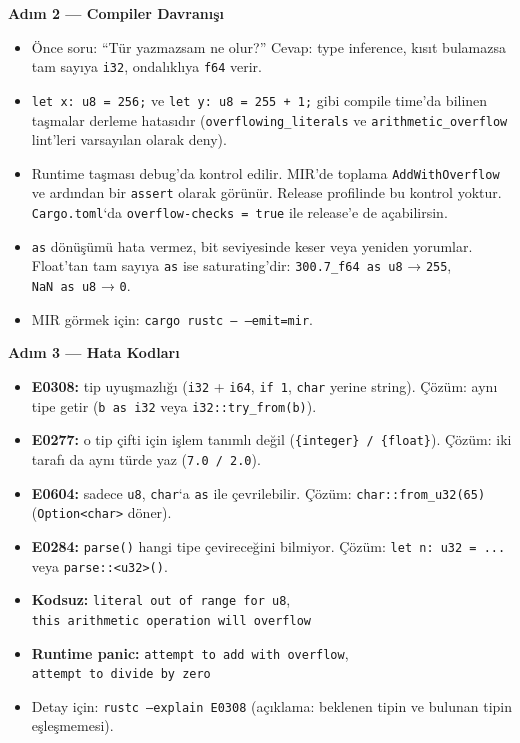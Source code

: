 \documentclass[12pt,a4paper]{article}
\begin{document}
\textbf{Adım 2 --- Compiler Davranışı}

\begin{itemize}
\tightlist
\item
  Önce soru: ``Tür yazmazsam ne olur?'' Cevap: type inference, kısıt bulamazsa tam sayıya \texttt{i32}, ondalıklıya \texttt{f64} verir.
\item
  \texttt{let\ x:\ u8\ =\ 256;} ve \texttt{let\ y:\ u8\ =\ 255\ +\ 1;} gibi compile time'da bilinen taşmalar derleme hatasıdır (\texttt{overflowing\_literals} ve \texttt{arithmetic\_overflow} lint'leri varsayılan olarak deny).
\item
  Runtime taşması debug'da kontrol edilir. MIR'de toplama \texttt{AddWithOverflow} ve ardından bir \texttt{assert} olarak görünür. Release profilinde bu kontrol yoktur. \texttt{Cargo.toml}`da \texttt{overflow-checks\ =\ true} ile release'e de açabilirsin.
\item
  \texttt{as} dönüşümü hata vermez, bit seviyesinde keser veya yeniden yorumlar. Float'tan tam sayıya \texttt{as} ise saturating'dir: \texttt{300.7\_f64\ as\ u8} → \texttt{255}, \texttt{NaN\ as\ u8} → \texttt{0}.
\item
  MIR görmek için: \texttt{cargo\ rustc\ --\ --emit=mir}.
\end{itemize}

\textbf{Adım 3 --- Hata Kodları}

\begin{itemize}
\tightlist
\item
  \textbf{E0308:} tip uyuşmazlığı (\texttt{i32} + \texttt{i64}, \texttt{if\ 1}, \texttt{char} yerine string). Çözüm: aynı tipe getir (\texttt{b\ as\ i32} veya \texttt{i32::try\_from(b)}).
\item
  \textbf{E0277:} o tip çifti için işlem tanımlı değil (\texttt{\{integer\}\ /\ \{float\}}). Çözüm: iki tarafı da aynı türde yaz (\texttt{7.0\ /\ 2.0}).
\item
  \textbf{E0604:} sadece \texttt{u8}, \texttt{char}`a \texttt{as} ile çevrilebilir. Çözüm: \texttt{char::from\_u32(65)} (\texttt{Option\textless{}char\textgreater{}} döner).
\item
  \textbf{E0284:} \texttt{parse()} hangi tipe çevireceğini bilmiyor. Çözüm: \texttt{let\ n:\ u32\ =\ ...} veya \texttt{parse::\textless{}u32\textgreater{}()}.
\item
  \textbf{Kodsuz:} \texttt{literal\ out\ of\ range\ for\ u8}, \texttt{this\ arithmetic\ operation\ will\ overflow}
\item
  \textbf{Runtime panic:} \texttt{attempt\ to\ add\ with\ overflow}, \texttt{attempt\ to\ divide\ by\ zero}
\item
  Detay için: \texttt{rustc\ --explain\ E0308} (açıklama: beklenen tipin ve bulunan tipin eşleşmemesi).
\end{itemize}
\end{document}
